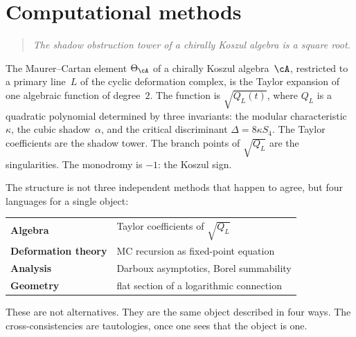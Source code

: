 %
%
%

\providecommand{\ShadowMetric}{Q_L}
\providecommand{\ShadowGF}{H}
\providecommand{\CritDisc}{\Delta}
\providecommand{\ShadowGrowth}{\rho}
\providecommand{\BorelT}{\mathcal{B}}
\providecommand{\StokesConst}{\mathfrak{S}}
\providecommand{\CE}{\mathrm{CE}}
\providecommand{\BRST}{\mathrm{BRST}}
\providecommand{\SDR}{\mathrm{SDR}}


\chapter{Computational methods}\label{chap:computational-methods}

\begin{quote}\itshape
The shadow obstruction tower of a chirally Koszul algebra is a square root.
\end{quote}

\bigskip

The Maurer--Cartan element $\Theta_\cA$ of a chirally Koszul
algebra~$\cA$, restricted to a primary line~$L$ of the cyclic
deformation complex, is the Taylor expansion of one algebraic
function of degree~$2$. The function is $\sqrt{\ShadowMetric(t)}$,
where $\ShadowMetric$ is a quadratic polynomial determined by
three invariants: the modular characteristic~$\kappa$, the cubic
shadow~$\alpha$, and the critical discriminant
$\CritDisc = 8\kappa S_4$. The Taylor coefficients are the shadow
tower. The branch points of $\sqrt{\ShadowMetric}$ are the
singularities. The monodromy is $-1$: the Koszul sign.

The structure is not three independent methods that happen to agree,
but four languages for a single object:
\begin{center}
\small
\renewcommand{\arraystretch}{1.1}
\begin{tabular}{@{}ll@{}}
\textbf{Algebra} & Taylor coefficients of $\sqrt{\ShadowMetric}$ \\
\textbf{Deformation theory} & MC recursion as fixed-point equation \\
\textbf{Analysis} & Darboux asymptotics, Borel summability \\
\textbf{Geometry} & flat section of a logarithmic connection
\end{tabular}
\end{center}
These are not alternatives. They are the same object described
in four ways. The cross-consistencies are tautologies, once one
sees that the object is one.


